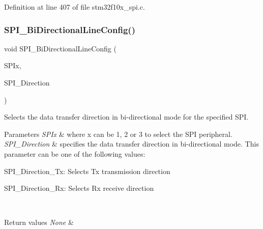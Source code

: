 Definition at line 407 of file stm32f10x\+\_\+spi.\+c.

\mbox{\label{group___s_p_i___exported___functions_ga166171c421fc51da7714723524d41b45}} 
\subsubsection{\texorpdfstring{S\+P\+I\+\_\+\+Bi\+Directional\+Line\+Config()}{SPI\_BiDirectionalLineConfig()}}
{\footnotesize\ttfamily void S\+P\+I\+\_\+\+Bi\+Directional\+Line\+Config (\begin{DoxyParamCaption}\item[{\hyperlink{struct_s_p_i___type_def}{S\+P\+I\+\_\+\+Type\+Def} $\ast$}]{S\+P\+Ix,  }\item[{uint16\+\_\+t}]{S\+P\+I\+\_\+\+Direction }\end{DoxyParamCaption})}



Selects the data transfer direction in bi-\/directional mode for the specified S\+PI. 


\begin{DoxyParams}{Parameters}
{\em S\+P\+Ix} & where x can be 1, 2 or 3 to select the S\+PI peripheral. \\
\hline
{\em S\+P\+I\+\_\+\+Direction} & specifies the data transfer direction in bi-\/directional mode. This parameter can be one of the following values\+: \begin{DoxyItemize}
\item S\+P\+I\+\_\+\+Direction\+\_\+\+Tx\+: Selects Tx transmission direction \item S\+P\+I\+\_\+\+Direction\+\_\+\+Rx\+: Selects Rx receive direction \end{DoxyItemize}
\\
\hline
\end{DoxyParams}

\begin{DoxyRetVals}{Return values}
{\em None} & \\
\hline
\end{DoxyRetVals}


